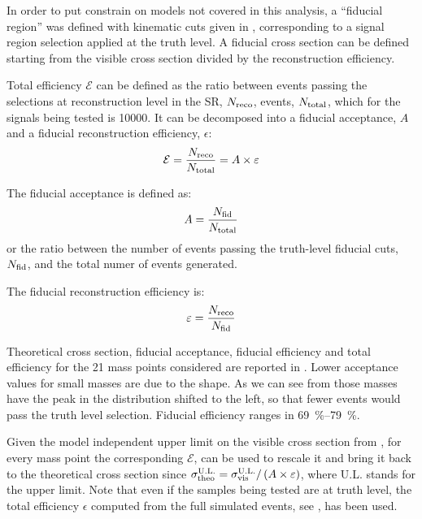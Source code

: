 In order to put constrain on models not covered in this analysis, a ``fiducial region'' was defined with kinematic cuts given in \Sect{\ref{sec:truth}}, corresponding to a signal region selection applied at the truth level. A fiducial cross section can be defined starting from the visible cross section divided by the reconstruction efficiency.

Total efficiency $\mathcal{E}$ can be defined as the ratio between events passing the selections at reconstruction level in the SR, $N_\textup{reco}$, events, $N_\textup{total}$, which for the signals being tested is \num{10000}. It can be decomposed into a fiducial acceptance, $A$ and a fiducial reconstruction efficiency, $\epsilon$:
\begin{equation}
	\mathcal{E}=\frac{N_\textup{reco}}{N_\textup{total}}=A\times\epsilon
\end{equation}

The fiducial acceptance is defined as:
\begin{equation}
	A=\frac{N_\textup{fid}}{N_\textup{total}}
	\label{eqn:accfid}
\end{equation}
or the ratio between the number of events passing the truth-level fiducial cuts, $N_\textup{fid}$, and the total numer of events generated. 

The fiducial reconstruction efficiency is:
\begin{equation}
	\epsilon=\frac{N_\textup{reco}}{N_\textup{fid}}
	\label{eqn:efffid}
\end{equation}

Theoretical cross section, fiducial acceptance, fiducial efficiency and total efficiency for the \num{21} mass points considered are reported in \Tab{\ref{tab:eff}}. Lower acceptance values for small masses are due to the \met shape. As we can see from \Fig{\ref{fig:validation}} those masses have the peak in the \met distribution shifted to the left, so that fewer events would pass the truth level selection. Fiducial efficiency ranges in \SIrange{69}{79}{\percent}.

Given the model independent upper limit on the visible cross section from \Tab{\ref{table.results.exclxsec.pval.upperlimit.SR}}, for every mass point the corresponding $\mathcal{E}$, can be used to rescale it and bring it back to the theoretical cross section since $\sigma_\textup{theo}^\textup{U.L.}=\sigma_\textup{vis}^\textup{U.L.}/\left(A\times\epsilon\right)$, where U.L. stands for the \sv upper limit. Note that even if the samples being tested are at truth level, the total efficiency $\epsilon$ computed from the full simulated events, see \Sect{\ref{sec:full}}, has been used.

